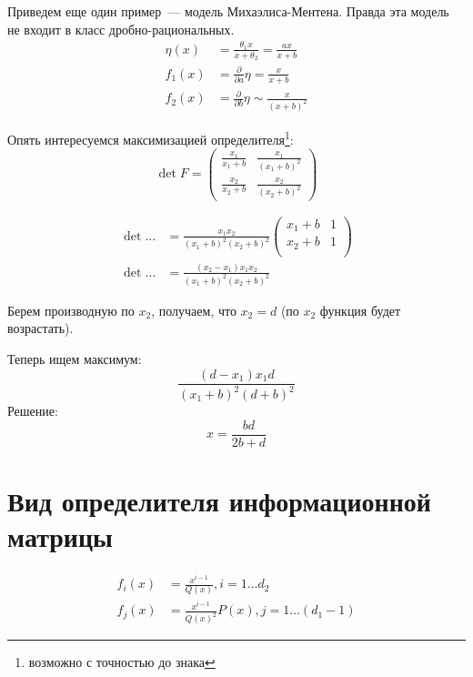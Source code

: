\begin{ex}
Приведем еще один пример — модель Михаэлиса-Ментена. Правда эта модель не входит в класс дробно-рациональных.
\begin{equation}
\label{michelMentenModel}
\begin{split}
\eta(x) &= \frac{\theta_1 x}{x+\theta_2} = \frac{ax}{x+b}\\
f_1(x) &= \frac{\partial}{\partial{a}}\eta=\frac{x}{x+b} \\
f_2(x) &= \frac{\partial}{\partial{b}}\eta \sim \frac{x}{(x+b)^2}
\end{split}
\end{equation}

Опять интересуемся максимизацией определителя\footnote{возможно с точностью до знака}:
\begin{equation}
\det F = \begin{pmatrix}
\frac{x_1}{x_1+b} & \frac{x_1}{(x_1+b)^2} \\
\frac{x_2}{x_2+b} & \frac{x_2}{(x_2+b)^2} 
\end{pmatrix}
\end{equation}

\begin{align}
\det … &= \frac{x_1x_2}{(x_1+b)^2(x_2+b)^2}\begin{pmatrix} 
x_1 + b & 1 \\
x_2 + b & 1 \\
\end{pmatrix}\\
\det … &= \frac{(x_2 - x_1) x_1 x_2}{(x_1 + b)^2 (x_2 + b)^2}
\end{align}

Берем производную по $x_2$, получаем, что $x_2 = d$ (по $x_2$ функция будет возрастать).

Теперь ищем максимум:
\begin{equation}
\frac{(d - x_1) x_1 d}{(x_1 + b)^2 (d + b)^2}
\end{equation}
Решение: 
$$x = \frac{bd}{2b + d}$$
\end{ex}


\section{Вид определителя информационной матрицы}

\begin{align}
f_i(x) &= \frac{x^{i-1}}{Q(x)}, i =1 … d_2 \\
f_{j}(x) &= \frac{x^{i-1}}{Q(x)^2}P(x), j = 1…(d_1-1)
\end{align}

